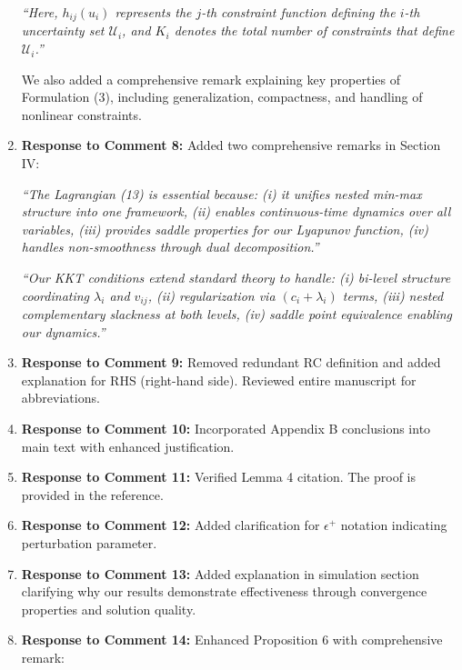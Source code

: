 \documentclass[journal,twoside,web]{ieeecolor}
\begin{document}
\begin{enumerate}
{\color{revisionblue}\textit{``Here, $h_{ij}(u_i)$ represents the $j$-th constraint function defining the $i$-th uncertainty set $\mathcal{U}_i$, and $K_i$ denotes the total number of constraints that define $\mathcal{U}_i$.''}}

We also added a comprehensive remark explaining key properties of Formulation (3), including generalization, compactness, and handling of nonlinear constraints.

\item \textbf{Response to Comment 8:} Added two comprehensive remarks in Section IV:

{\color{revisionblue}\textit{``The Lagrangian (13) is essential because: (i) it unifies nested min-max structure into one framework, (ii) enables continuous-time dynamics over all variables, (iii) provides saddle properties for our Lyapunov function, (iv) handles non-smoothness through dual decomposition.''}}

{\color{revisionblue}\textit{``Our KKT conditions extend standard theory to handle: (i) bi-level structure coordinating $\lambda_i$ and $v_{ij}$, (ii) regularization via $(c_i + \lambda_i)$ terms, (iii) nested complementary slackness at both levels, (iv) saddle point equivalence enabling our dynamics.''}}

\item \textbf{Response to Comment 9:} Removed redundant RC definition and added explanation for RHS (right-hand side). Reviewed entire manuscript for abbreviations.

\item \textbf{Response to Comment 10:} Incorporated Appendix B conclusions into main text with enhanced justification.

\item \textbf{Response to Comment 11:} Verified Lemma 4 citation. The proof is provided in the reference.

\item \textbf{Response to Comment 12:} Added clarification for $\epsilon^+$ notation indicating perturbation parameter.

\item \textbf{Response to Comment 13:} Added explanation in simulation section clarifying why our results demonstrate effectiveness through convergence properties and solution quality.

\item \textbf{Response to Comment 14:} Enhanced Proposition 6 with comprehensive remark:


\end{enumerate}
\end{document}

